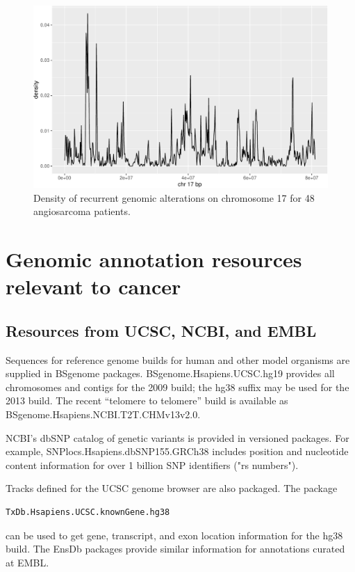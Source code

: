 \documentclass[graybox]{svmult}
\begin{document}
\begin{figure}
\includegraphics[width=1\linewidth,]{bioccb_files/figure-latex/mkden-1} \caption{Density of recurrent genomic alterations on chromosome 17 for 48 angiosarcoma patients.}\label{fig:mkden}
\end{figure}



\section{Genomic annotation resources relevant to cancer}\label{hubs}


\subsection{Resources from UCSC, NCBI, and EMBL}\label{resources-from-ucsc-ncbi-and-embl}

Sequences for reference genome builds for human and
other model organisms are supplied in BSgenome packages.
BSgenome.Hsapiens.UCSC.hg19 provides all chromosomes and
contigs for the 2009 build; the hg38 suffix may be used
for the 2013 build. The recent ``telomere to telomere''
build is available as BSgenome.Hsapiens.NCBI.T2T.CHMv13v2.0.

NCBI's dbSNP catalog of genetic variants is provided
in versioned packages.
For example, SNPlocs.Hsapiens.dbSNP155.GRCh38 includes
position and nucleotide content information for over
1 billion SNP identifiers ("rs numbers").

Tracks defined for the UCSC genome browser are also
packaged. The package 
\begin{verbatim}
TxDb.Hsapiens.UCSC.knownGene.hg38 
\end{verbatim} 
can be
used to get gene, transcript, and exon location information
for the hg38 build. The EnsDb packages provide similar
information for annotations curated at EMBL.
\end{document}
